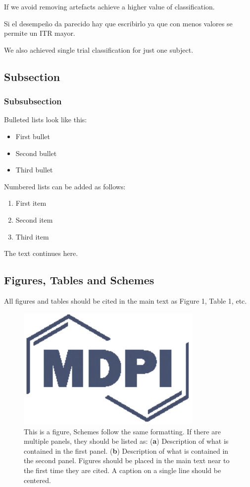 \documentclass[entropy,article,submit,moreauthors,pdftex,10pt,a4paper]{mdpi}
\begin{document}
If we avoid removing artefacts achieve a higher value of classification.

Si el desempeño da parecido hay que escribirlo ya que con menos valores se permite un ITR mayor.

We also achieved single trial classification for just one subject.


\subsection{Subsection}

\subsubsection{Subsubsection}

Bulleted lists look like this:
\begin{itemize}[leftmargin=*,labelsep=4mm]
\item	First bullet
\item	Second bullet
\item	Third bullet
\end{itemize}

Numbered lists can be added as follows:
\begin{enumerate}[leftmargin=*,labelsep=3mm]
\item	First item
\item	Second item
\item	Third item
\end{enumerate}

The text continues here.

\subsection{Figures, Tables and Schemes}

All figures and tables should be cited in the main text as Figure 1, Table 1, etc.

\begin{figure}[H]
\centering
\includegraphics[width=9cm]{subjectaveraged.eps}
\caption{This is a figure, Schemes follow the same formatting. If there are multiple panels, they should be listed as: (\textbf{a}) Description of what is contained in the first panel. (\textbf{b}) Description of what is contained in the second panel. Figures should be placed in the main text near to the first time they are cited. A caption on a single line should be centered.}
\end{figure}   
\end{document}
